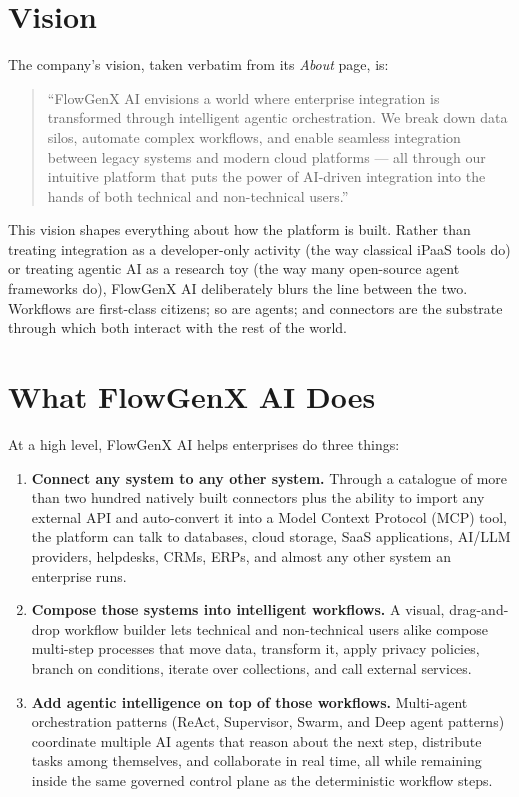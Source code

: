 \section{Vision}
The company's vision, taken verbatim from its \emph{About} page, is:

\begin{quote}
``FlowGenX AI envisions a world where enterprise integration is
transformed through intelligent agentic orchestration. We break down
data silos, automate complex workflows, and enable seamless
integration between legacy systems and modern cloud platforms --- all
through our intuitive platform that puts the power of AI-driven
integration into the hands of both technical and non-technical
users.''
\end{quote}

This vision shapes everything about how the platform is built. Rather
than treating integration as a developer-only activity (the way
classical iPaaS tools do) or treating agentic AI as a research toy
(the way many open-source agent frameworks do), FlowGenX AI
deliberately blurs the line between the two. Workflows are first-class
citizens; so are agents; and connectors are the substrate through
which both interact with the rest of the world.

\section{What FlowGenX AI Does}
At a high level, FlowGenX AI helps enterprises do three things:

\begin{enumerate}[leftmargin=*]
    \item \textbf{Connect any system to any other system.} Through a
    catalogue of more than two hundred natively built connectors plus
    the ability to import any external API and auto-convert it into a
    Model Context Protocol (MCP) tool, the platform can talk to
    databases, cloud storage, SaaS applications, AI/LLM providers,
    helpdesks, CRMs, ERPs, and almost any other system an enterprise
    runs.

    \item \textbf{Compose those systems into intelligent workflows.}
    A visual, drag-and-drop workflow builder lets technical and
    non-technical users alike compose multi-step processes that move
    data, transform it, apply privacy policies, branch on conditions,
    iterate over collections, and call external services.

    \item \textbf{Add agentic intelligence on top of those workflows.}
    Multi-agent orchestration patterns (ReAct, Supervisor, Swarm, and
    Deep agent patterns) coordinate multiple AI agents that reason
    about the next step, distribute tasks among themselves, and
    collaborate in real time, all while remaining inside the same
    governed control plane as the deterministic workflow steps.
\end{enumerate}

